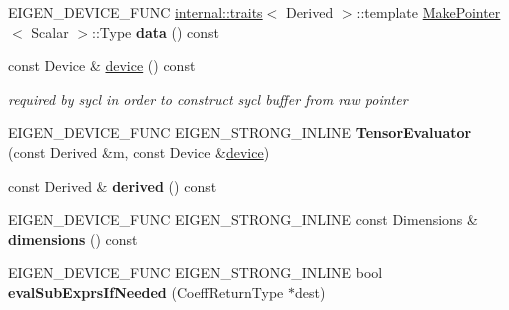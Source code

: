 \begin{DoxyCompactItemize}
\mbox{\label{struct_eigen_1_1_tensor_evaluator_a2eea86ebd5046050b35b417a17a0e749}} 
E\+I\+G\+E\+N\+\_\+\+D\+E\+V\+I\+C\+E\+\_\+\+F\+U\+NC \hyperlink{struct_eigen_1_1internal_1_1traits}{internal\+::traits}$<$ Derived $>$\+::template \hyperlink{struct_eigen_1_1_make_pointer}{Make\+Pointer}$<$ Scalar $>$\+::Type {\bfseries data} () const
\item 
\mbox{\label{struct_eigen_1_1_tensor_evaluator_a98b51809ed8f7a1f736eb7b952b9636e}} 
const Device \& \hyperlink{struct_eigen_1_1_tensor_evaluator_a98b51809ed8f7a1f736eb7b952b9636e}{device} () const
\begin{DoxyCompactList}\small\item\em required by sycl in order to construct sycl buffer from raw pointer \end{DoxyCompactList}\item 
\mbox{\label{struct_eigen_1_1_tensor_evaluator_a43bea98dc719e3b6ac73ab2df0291455}} 
E\+I\+G\+E\+N\+\_\+\+D\+E\+V\+I\+C\+E\+\_\+\+F\+U\+NC E\+I\+G\+E\+N\+\_\+\+S\+T\+R\+O\+N\+G\+\_\+\+I\+N\+L\+I\+NE {\bfseries Tensor\+Evaluator} (const Derived \&m, const Device \&\hyperlink{struct_eigen_1_1_tensor_evaluator_a98b51809ed8f7a1f736eb7b952b9636e}{device})
\item 
\mbox{\label{struct_eigen_1_1_tensor_evaluator_aabcd5bdca16b32dd86ebddd3b37b1f6c}} 
const Derived \& {\bfseries derived} () const
\item 
\mbox{\label{struct_eigen_1_1_tensor_evaluator_af32e0f48e24581602b66e9d33af58c85}} 
E\+I\+G\+E\+N\+\_\+\+D\+E\+V\+I\+C\+E\+\_\+\+F\+U\+NC E\+I\+G\+E\+N\+\_\+\+S\+T\+R\+O\+N\+G\+\_\+\+I\+N\+L\+I\+NE const Dimensions \& {\bfseries dimensions} () const
\item 
\mbox{\label{struct_eigen_1_1_tensor_evaluator_ae188d806978166eb8cbffbd63c944fb3}} 
E\+I\+G\+E\+N\+\_\+\+D\+E\+V\+I\+C\+E\+\_\+\+F\+U\+NC E\+I\+G\+E\+N\+\_\+\+S\+T\+R\+O\+N\+G\+\_\+\+I\+N\+L\+I\+NE bool {\bfseries eval\+Sub\+Exprs\+If\+Needed} (Coeff\+Return\+Type $\ast$dest)
\item 
\mbox{\label{struct_eigen_1_1_tensor_evaluator_a76ec54bcca9523ec104aaa9adaf74983}} 

\end{DoxyCompactItemize}
